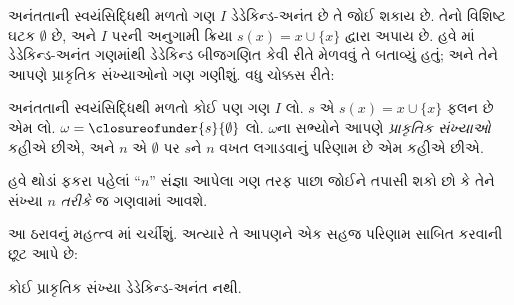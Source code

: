 \documentclass[../../../include/open-logic-section]{subfiles}
\begin{document}
અનંતતાની સ્વયંસિદ્ધિથી મળતો ગણ $I$ ડેડેકિન્ડ-અનંત છે તે જોઈ શકાય
છે. તેનો વિશિષ્ટ ઘટક $\emptyset$ છે, અને $I$ પરની અનુગામી ક્રિયા
$s(x) = x\cup
\{x\}$ દ્વારા અપાય છે. હવે
માં
ડેડેકિન્ડ-અનંત ગણમાંથી ડેડેકિન્ડ બીજગણિત કેવી રીતે મેળવવું તે
બતાવ્યું હતું; અને તેને આપણે પ્રાકૃતિક સંખ્યાઓનો ગણ ગણીશું.
વધુ ચોક્કસ રીતે:
\begin{defn}
અનંતતાની સ્વયંસિદ્ધિથી મળતો કોઈ પણ ગણ $I$ લો. $s$ એ
$s(x) = x \cup \{x\}$ ફલન છે એમ લો. $\omega =
\closureofunder{s}{\emptyset}$ લો. $\omega$ના સભ્યોને આપણે
\emph{પ્રાકૃતિક સંખ્યાઓ} કહીએ છીએ, અને $n$ એ $\emptyset$ પર
$s$ને $n$ વખત લગાડવાનું પરિણામ છે એમ કહીએ છીએ.
\end{defn}

હવે થોડાં ફકરા પહેલાં “$n$” સંજ્ઞા આપેલા ગણ તરફ પાછા જોઈને
તપાસી શકો છો કે તેને સંખ્યા $n$ \emph{તરીકે} જ ગણવામાં આવશે.

આ ઠરાવનું મહત્ત્વ માં ચર્ચીશું.
અત્યારે તે આપણને એક સહજ પરિણામ સાબિત કરવાની છૂટ આપે છે:

\begin{prop}
કોઈ પ્રાકૃતિક સંખ્યા ડેડેકિન્ડ-અનંત નથી.
\end{prop}
\end{document}
